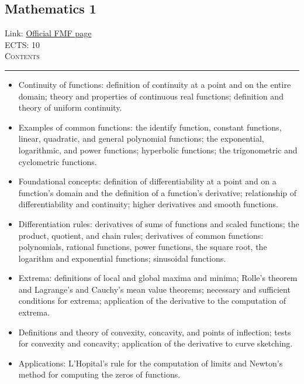 \documentclass[11pt, a4paper]{article}
\newenvironment{course}[3]{
\subsection{#1}%
Link: \href{#2}{Official FMF page}\\%
ECTS: #3%
\vspace{1ex}
\\
{\large \textsc{Contents}}\\[-0.9ex]%
\rule{\textwidth}{0.5pt}
\vspace{-3ex}
}
{}
\newenvironment{chapter}[1]{
\begin{tcolorbox}[title=#1, breakable]
}
{\end{tcolorbox}}
\begin{document}
\begin{course}{Mathematics 1}{https://www.fmf.uni-lj.si/en/study-physics/programmes/1fiz/2020/7000777/courses/520/}{10}
\begin{chapter}{Functions of a single variable}
\begin{itemize}
            \item Continuity of functions: definition of continuity at a point and on the entire domain; theory and properties of continuous real functions; definition and theory of uniform continuity.

            \item Examples of common functions:  the identify function, constant functions, linear, quadratic, and general polynomial functions; the exponential, logarithmic, and power functions; hyperbolic functions; the trigonometric and cyclometric functions.

        \end{itemize}
    \end{chapter}

    \begin{chapter}{Differential calculus}
        \begin{itemize}
        
            \item Foundational concepts: definition of differentiability at a point and on a function's domain and the definition of a function's derivative; relationship of differentiability and continuity; higher derivatives and smooth functions.

            \item Differentiation rules: derivatives of sums of functions and scaled functions; the product, quotient, and chain rules;
            derivatives of common functions: polynomials, rational functions, power functions, the square root, the logarithm and exponential functions; sinusoidal functions.

            \item Extrema: definitions of local and global maxima and minima;
            Rolle's theorem and Lagrange's and Cauchy's mean value theorems;
            necessary and sufficient conditions for extrema; application of the derivative to the computation of extrema.

            \item Definitions and theory of convexity, concavity, and points of inflection; tests for convexity and concavity; application of the derivative to curve sketching.

            \item Applications: L'Hopital's rule for the computation of limits and Newton's method for computing the zeros of functions.

        \end{itemize}
    \end{chapter}


\end{course}
\end{document}
